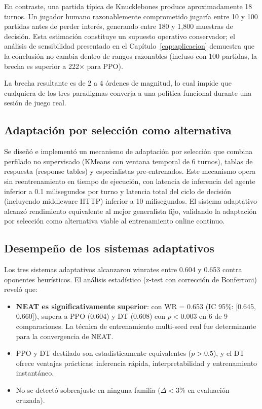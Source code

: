 En contraste, una partida típica de Knucklebones produce aproximadamente 18 turnos. Un jugador humano razonablemente comprometido jugaría entre 10 y 100 partidas antes de perder interés, generando entre 180 y 1,800 muestras de decisión. Esta estimación constituye un supuesto operativo conservador; el análisis de sensibilidad presentado en el Capítulo~\ref{cap:aplicacion} demuestra que la conclusión no cambia dentro de rangos razonables (incluso con 100 partidas, la brecha es superior a 222$\times$ para PPO).

La brecha resultante es de 2 a 4 órdenes de magnitud, lo cual impide que cualquiera de los tres paradigmas converja a una política funcional durante una sesión de juego real.

\subsection{Adaptación por selección como alternativa}

Se diseñó e implementó un mecanismo de adaptación por selección que combina perfilado no supervisado (KMeans con ventana temporal de 6 turnos), tablas de respuesta (response tables) y especialistas pre-entrenados. Este mecanismo opera sin reentrenamiento en tiempo de ejecución, con latencia de inferencia del agente inferior a 0.1 milisegundos por turno y latencia total del ciclo de decisión (incluyendo middleware HTTP) inferior a 10 milisegundos. El sistema adaptativo alcanzó rendimiento equivalente al mejor generalista fijo, validando la adaptación por selección como alternativa viable al entrenamiento online continuo.

\subsection{Desempeño de los sistemas adaptativos}

Los tres sistemas adaptativos alcanzaron winrates entre 0.604 y 0.653 contra oponentes heurísticos. El análisis estadístico (z-test con corrección de Bonferroni) reveló que:

\begin{itemize}
    \item \textbf{NEAT es significativamente superior}: con WR = 0.653 (IC 95\%: [0.645, 0.660]), supera a PPO (0.604) y DT (0.608) con $p < 0.003$ en 6 de 9 comparaciones. La técnica de entrenamiento multi-seed real fue determinante para la convergencia de NEAT.
    \item PPO y DT destilado son estadísticamente equivalentes ($p > 0.5$), y el DT ofrece ventajas prácticas: inferencia rápida, interpretabilidad y entrenamiento instantáneo.
    \item No se detectó sobreajuste en ninguna familia ($\Delta < 3\%$ en evaluación cruzada).
\end{itemize}

